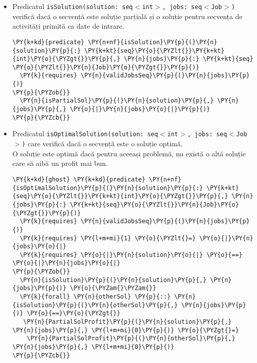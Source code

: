 \begin{itemize}
    \item Predicatul \texttt{isSolution(solution: seq$<$int$>$, jobs: seq$<$Job$>$)} verifică dacă o secvență este soluție parțială și o soluție pentru secvența de activități primită ca date de intrare.
    \begin{Verbatim}[commandchars=\\\{\}, fontsize=\footnotesize]
\PY{k+kd}{predicate} \PY{n+nf}{isSolution}\PY{p}{(}\PY{n}{solution}\PY{p}{:} \PY{k+kt}{seq}\PY{o}{\PYZlt{}}\PY{k+kt}{int}\PY{o}{\PYZgt{}}\PY{p}{,} \PY{n}{jobs}\PY{p}{:} \PY{k+kt}{seq} \PY{o}{\PYZlt{}}\PY{n}{Job}\PY{o}{\PYZgt{}}\PY{p}{)}
  \PY{k}{requires} \PY{n}{validJobsSeq}\PY{p}{(}\PY{n}{jobs}\PY{p}{)}
\PY{p}{\PYZob{}}
  \PY{n}{isPartialSol}\PY{p}{(}\PY{n}{solution}\PY{p}{,} \PY{n}{jobs}\PY{p}{,} \PY{o}{|}\PY{n}{jobs}\PY{o}{|}\PY{p}{)}
\PY{p}{\PYZcb{}}
\end{Verbatim}
    \item Predicatul \texttt{isOptimalSolution(solution: seq$<$int$>$, jobs: seq$<$Job$>$)} care verifică dacă o secvență este o soluție optimă.\\
    O soluție este optimă dacă pentru aceeași problemă, nu există o altă soluție care să aibă un profit mai bun.
    \begin{footnotesize}
    \begin{Verbatim}[commandchars=\\\{\}, fontsize=\footnotesize]
\PY{k+kd}{ghost} \PY{k+kd}{predicate} \PY{n+nf}{isOptimalSolution}\PY{p}{(}\PY{n}{solution}\PY{p}{:} \PY{k+kt}{seq}\PY{o}{\PYZlt{}}\PY{k+kt}{int}\PY{o}{\PYZgt{}}\PY{p}{,} \PY{n}{jobs}\PY{p}{:} \PY{k+kt}{seq}\PY{o}{\PYZlt{}}\PY{n}{Job}\PY{o}{\PYZgt{}}\PY{p}{)}
  \PY{k}{requires} \PY{n}{validJobsSeq}\PY{p}{(}\PY{n}{jobs}\PY{p}{)}
  \PY{k}{requires} \PY{l+m+mi}{1} \PY{o}{\PYZlt{}=} \PY{o}{|}\PY{n}{jobs}\PY{o}{|}
  \PY{k}{requires} \PY{o}{|}\PY{n}{solution}\PY{o}{|} \PY{o}{==} \PY{o}{|}\PY{n}{jobs}\PY{o}{|}
\PY{p}{\PYZob{}}
  \PY{n}{isSolution}\PY{p}{(}\PY{n}{solution}\PY{p}{,} \PY{n}{jobs}\PY{p}{)} \PY{o}{\PYZam{}\PYZam{}}
  \PY{k}{forall} \PY{n}{otherSol} \PY{p}{::} \PY{n}{isSolution}\PY{p}{(}\PY{n}{otherSol}\PY{p}{,} \PY{n}{jobs}\PY{p}{)} \PY{o}{==}\PY{o}{\PYZgt{}} 
   \PY{n}{PartialSolProfit}\PY{p}{(}\PY{n}{solution}\PY{p}{,} \PY{n}{jobs}\PY{p}{,} \PY{l+m+mi}{0}\PY{p}{)} \PY{o}{\PYZgt{}=} 
    \PY{n}{PartialSolProfit}\PY{p}{(}\PY{n}{otherSol}\PY{p}{,} \PY{n}{jobs}\PY{p}{,} \PY{l+m+mi}{0}\PY{p}{)}
\PY{p}{\PYZcb{}}
\end{Verbatim}
\end{footnotesize}
\end{itemize} 


